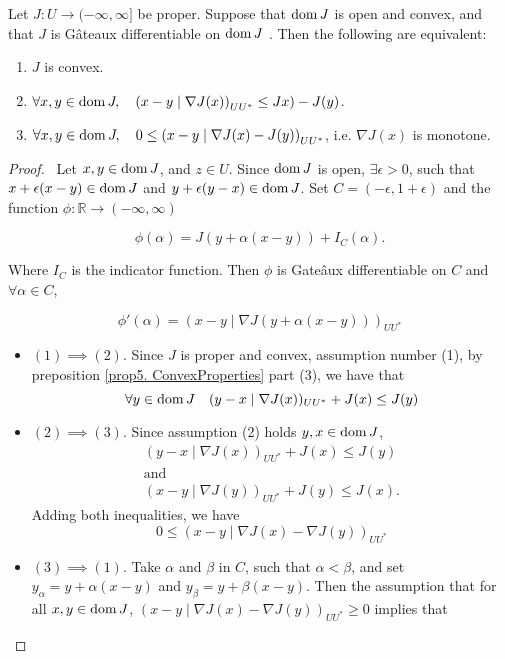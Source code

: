 \begin{proposition}
	 Let $J: U \rightarrow (-\infty, \infty]$ be proper. Suppose that $\mathrm{dom\,} J$
	 is open and convex, and that $J$ is G\^ateaux differentiable on $\mathrm{dom\,} J$ . Then the
	 following are equivalent:
	 \begin{enumerate}
		 \item $J$ is convex.
		 \item $\forall x,y \in \mathrm{dom\,} J, \quad \left(x-y\mid \nabla J(x)\right)_{UU^*}\leq Jx)-J(y)$.
		 \item $\forall x,y \in \mathrm{dom\,} J, \quad 0 \leq \left(x-y\mid \nabla J(x)-J(y)\right)_{UU^*}$, i.e. $
		 \nabla J(x)$ is monotone.
	 \end{enumerate}
	 \begin{proof}\
  Let $x,y \in \mathrm{dom\,} J$, and $z \in U$. Since $\mathrm{dom\,} J$ is open, $\exists \epsilon >0$, such that $x+\epsilon(x-y) \in \mathrm{dom\,} J$ and $y+\epsilon(y-x) \in \mathrm{dom\,} J$. Set $C=(-\epsilon, 1+\epsilon)$ and the function $\phi: \mathbb{R}\rightarrow(-\infty, \infty)$

		 \[
			 \phi(\alpha) = J(y+\alpha(x-y))+I_C(\alpha).
		 \]
		 
		 Where $I_C$ is the indicator function.  Then $\phi$ is Gate\^aux differentiable on $C$ and $\forall \alpha \in C$,
		 
		 \[
			 \phi'(\alpha)=\left(x-y\mid\nabla J(y+\alpha (x-y))\right)_{UU^*}
		 \]
		 
		\begin{itemize}
		 \item $(1)\implies (2)$. Since $J$ is proper and convex, assumption number (1), by preposition \eqref{prop5. ConvexProperties} part (3), we have that 
		 	 \begin{equation*}
				\forall y \in \mathrm{dom\,} J \quad (y - x \mid \nabla J(x))_{UU^*}+J(x) \leq J(y)
		 	 \end{equation*}
		 \item $(2)\implies(3)$. Since assumption (2) holds $y, x \in \mathrm{dom\,} J$, 
		 \begin{gather*} 
		 (y - x \mid \nabla J(x))_{UU^*}+J(x) \leq J(y) \\
		 		\text{and} \\
		 (x - y \mid \nabla J(y))_{UU^*}+J(y) \leq J(x).
		 \end{gather*}
		 Adding both inequalities, we have
		 \begin{equation*}
		 0 \leq	(x - y \mid \nabla J(x)-\nabla J(y))_{UU^*}
		 \end{equation*}
		 \item $(3)\implies (1)$. Take $\alpha$ and $\beta$ in $C$, such that $\alpha<\beta$, and set $y_\alpha = y +\alpha(x-y)$ and $y_\beta= y +\beta(x-y)$. Then the assumption that for all $x,y \in \mathrm{dom\,} J$, $(x - y \mid \nabla J(x)-\nabla J(y))_{UU^*} \geq 0$ implies that 
		 

\end{itemize}
\end{proof}
\end{proposition}
